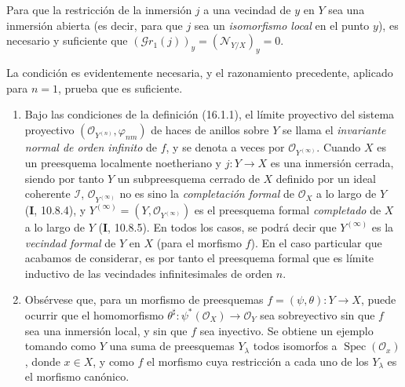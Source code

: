 \begin{corollary}[16.1.10]
\label{IV.16.1.10}
Para que la restricción de la inmersión $j$ a una vecindad de $y$ en $Y$ sea
una inmersión abierta \textup{(es decir, para que $j$ sea un \emph{isomorfismo local} en el
punto $y$)}, es necesario y suficiente que
$(\mathscr{G}r_1(j))_y=(\mathscr{N}_{Y/X})_y=0$.
\end{corollary}

La condición es evidentemente necesaria, y el razonamiento precedente, aplicado
para $n=1$, prueba que es suficiente.

\begin{remarks}[16.1.11]
\label{IV.16.1.11}
\begin{enumerate}
\item[(i)] Bajo las condiciones de la definición (16.1.1), el límite proyectivo
del sistema proyectivo
$(\mathcal{O}_{Y^{(n)}},\varphi_{nm})$ de haces de anillos sobre $Y$ se
llama el \emph{invariante normal de orden infinito} de $f$, y se denota a veces por
$\mathcal{O}_{Y^{(\infty)}}$. Cuando $X$ es un preesquema localmente
noetheriano y $j:Y\to X$ es una inmersión cerrada, siendo por tanto $Y$ un subpreesquema
cerrado de $X$ definido por un ideal coherente $\mathscr{I}$,
$\mathcal{O}_{Y^{(\infty)}}$ no es sino la \emph{completación formal} de
$\mathcal{O}_X$ a lo largo de $Y$ (\textbf I, 10.8.4), y
$Y^{(\infty)}=(Y,\mathcal{O}_{Y^{(\infty)}})$ es el preesquema formal \emph{completado} de
$X$ a lo largo de $Y$ (\textbf I, 10.8.5). En todos los casos, se podrá decir que
$Y^{(\infty)}$ es la \emph{vecindad formal} de $Y$ en $X$ (para el morfismo
$f$). En el caso particular que acabamos de considerar, es por tanto el preesquema
formal que es límite inductivo de las vecindades infinitesimales de orden $n$.
\item[(ii)] Obsérvese que, para un morfismo de preesquemas
$f=(\psi,\theta):Y\to X$, puede ocurrir que el homomorfismo
$\theta^\sharp:\psi^*(\mathcal{O}_X)\to\mathcal{O}_Y$ sea sobreyectivo sin que $f$
sea una inmersión
local, y sin que $f$ sea inyectivo. Se obtiene un ejemplo tomando como $Y$
una suma de preesquemas $Y_\lambda$ todos isomorfos a
$\operatorname{Spec}(\mathcal{O}_x)$, donde $x\in X$, y como $f$ el morfismo
cuya restricción a cada uno de los $Y_\lambda$ es el morfismo canónico.
\end{enumerate}
\end{remarks}
